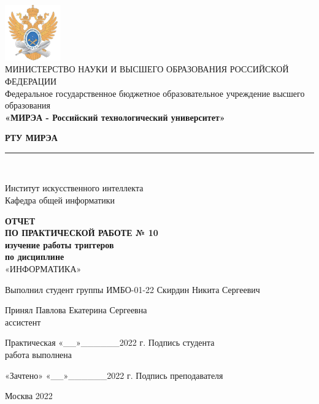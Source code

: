 \documentclass[14pt, a4paper]{extreport}
\newcommand{\doublerule}[1][.4pt]{%
	\noindent
	\makebox[0pt][l]{\rule[.6ex]{\linewidth}{#1}}%
	\rule[.3ex]{\linewidth}{#1}
}
\begin{document}
\begin{titlepage}
	\begin{center}
		\vspace*{0.5mm}

		\includegraphics[width=0.18\textwidth]{logo}\\
		\footnotesize
		МИНИСТЕРСТВО НАУКИ И ВЫСШЕГО ОБРАЗОВАНИЯ РОССИЙСКОЙ ФЕДЕРАЦИИ\\
		\small
		Федеральное государственное бюджетное образовательное учреждение высшего образования\\
		\textbf{«МИРЭА - Российский технологический университет»}
		\vspace{0.5cm}

		\large \textbf{РТУ МИРЭА} \normalsize

		\doublerule[1pt]\\
		\vspace{0.4cm}

		Институт искусственного интеллекта\\
		Кафедра общей информатики
		\vspace{1.5cm}

		\textbf{ОТЧЕТ}\\
		\textbf{ПО ПРАКТИЧЕСКОЙ РАБОТЕ № 10}\\
		\textbf{изучение работы триггеров}\\
		\textbf{по дисциплине}\\
		«ИНФОРМАТИКА»
		\vspace{1.5cm}

		\small
		Выполнил студент группы ИМБО-01-22 \hfill Скирдин Никита Сергеевич
		\vspace{1cm}

		Принял \hfill Павлова Екатерина Сергеевна\\
		ассистент \hfill
		\vspace{1.5cm}

		\footnotesize
		\hspace{0.5cm} Практическая \hfill «\_\_»\_\_\_\_\_\_2022 г. \hfill Подпись студента\\
		\hspace{0.5cm} работа выполнена \hfill
		\vspace{0.5cm}

		\hspace{2cm} «Зачтено» \hfill «\_\_»\_\_\_\_\_\_2022 г. \hfill Подпись преподавателя
		\vfill

		\small
		Москва 2022
	\end{center}
	\thispagestyle{empty}
\end{titlepage}
\end{document}
